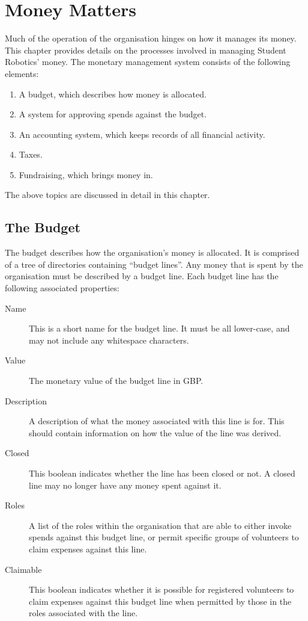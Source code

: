 \chapter{Money Matters}
\label{chapter:money-matters}

Much of the operation of the organisation hinges on how it manages its money.  This chapter provides details on the processes involved in managing Student Robotics' money.  The monetary management system consists of the following elements:

\begin{enumerate}
\item A budget, which describes how money is allocated.
\item A system for approving spends against the budget.
\item An accounting system, which keeps records of all financial activity.
\item Taxes.
\item Fundraising, which brings money in.
\end{enumerate}

The above topics are discussed in detail in this chapter.


\section{The Budget}
\label{sec:budget}

The budget describes how the organisation's money is allocated.  It is comprised of a tree of directories containing ``budget lines''.  Any money that is spent by the organisation must be described by a budget line.    Each budget line has the following associated properties:

\begin{description}
\item[Name] This is a short name for the budget line.  It must be all lower-case, and may not include any whitespace characters.
\item[Value]  The monetary value of the budget line in GBP.
\item[Description] A description of what the money associated with this line is for.  This should contain information on how the value of the line was derived.
\item[Closed] This boolean indicates whether the line has been closed or not.  A closed line may no longer have any money spent against it.
\item[Roles] A list of the roles within the organisation that are able to either invoke spends against this budget line, or permit specific groups of volunteers to claim expenses against this line.
\item[Claimable] This boolean indicates whether it is possible for registered volunteers to claim expenses against this budget line when permitted by those in the roles associated with the line.
\end{description}

